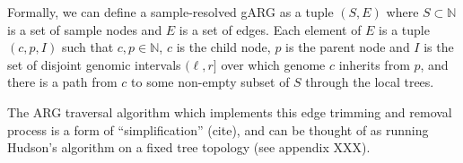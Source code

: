 \documentclass{article}
\begin{document}
Formally, we can define a sample-resolved gARG as a tuple $(S, E)$
where $S \subset \mathbb{N}$ is a set of sample nodes and
$E$ is a set of edges. Each element of $E$
is a tuple $(c, p, I)$ such that $c, p \in \mathbb{N}$,
$c$ is the child node, $p$ is the parent node and $I$ is the set of
disjoint genomic intervals $(\ell, r]$
over which genome $c$ inherits from $p$, and there is a path from
$c$ to some non-empty subset of $S$ through the local trees.

The ARG traversal algorithm which implements this edge trimming and removal process
is a form of ``simplification'' (cite), and can be thought of as running Hudson's algorithm
on a fixed tree topology (see appendix XXX).

\end{document}
